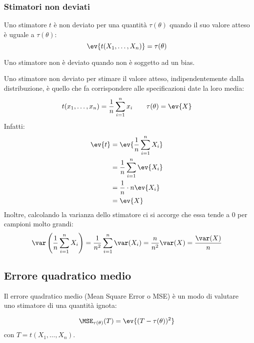 \subsubsection{Stimatori non deviati}
\begin{defin}
	Uno stimatore $t$ è non deviato per una quantità $\tau(\theta)$ quando il suo valore atteso è uguale a $\tau(\theta)$:
	\begin{equation*}
		\ev{t(X_1,\dots,X_n)} = \tau(\theta)
	\end{equation*}
\end{defin}
Uno stimatore non è deviato quando non è soggetto ad un bias.

\begin{examp}
	Uno stimatore non deviato per stimare il valore atteso, indipendentemente dalla distribuzione, è quello che fa corrispondere alle specificazioni date la loro media:
	\begin{equation*}
		t(x_1,\dots,x_n) = \frac{1}{n} \sum_{i=1}^n x_i \qquad \tau(\theta) = \ev{X}
	\end{equation*}
	Infatti:
	\begin{align*}
		\ev{t} & = \ev{\frac{1}{n} \sum_{i=1}^n X_i} \\
		       & = \frac{1}{n}\sum_{i=1}^n \ev{X_i}  \\
		       & = \frac{1}{n} \cdot n\ev{X_i}       \\
		       & = \ev{X}
	\end{align*}
	Inoltre, calcolando la varianza dello stimatore ci si accorge che essa tende a 0 per campioni molto grandi:
	\begin{equation*}
		\var\left(\frac{1}{n} \sum_{i=1}^n X_i\right) = \frac{1}{n^2} \sum_{i=1}^n \var(X_i) = \frac{n}{n^2}\var(X) = \frac{\var(X)}{n}
	\end{equation*}
\end{examp}


\subsection{Errore quadratico medio}
Il errore quadratico medio (Mean Square Error o MSE) è un modo di valutare uno stimatore di una quantità ignota:
\begin{defin}
	\begin{equation*}
		\MSE_{\tau(\theta)}(T) = \ev{(T-\tau(\theta))^2}
	\end{equation*}
	con $T=t(X_1,\dots,X_n)$.
\end{defin}

